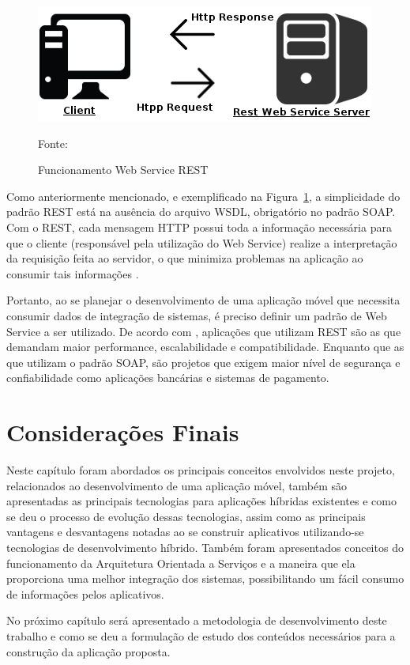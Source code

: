 \begin{figure}[H]
    \centering
    \includegraphics{imagens/rest.png}
    \caption{Funcionamento Web Service REST}
    Fonte: \cite{eulalio2016webservices}
    \label{fig: REST}
\end{figure}

Como anteriormente mencionado, e exemplificado na Figura~\ref{fig: REST}, a simplicidade do padrão REST está na ausência do arquivo WSDL, obrigatório no padrão SOAP. Com o REST, cada mensagem HTTP possui toda a informação necessária para que o cliente (responsável pela utilização do Web Service) realize a interpretação da requisição feita ao servidor, o que minimiza problemas na aplicação ao consumir tais informações \cite{eulalio2016webservices}.

Portanto, ao se planejar o desenvolvimento de uma aplicação móvel que necessita consumir dados de integração de sistemas, é preciso definir um padrão de Web Service a ser utilizado. De acordo com \cite{tihomirovs2016webservices}, aplicações que utilizam REST são as que demandam maior performance, escalabilidade e compatibilidade. Enquanto que as que utilizam o padrão SOAP, são projetos que exigem maior nível de segurança e confiabilidade como aplicações bancárias e sistemas de pagamento.




\section{Considerações Finais}

Neste capítulo foram abordados os principais conceitos envolvidos neste projeto, relacionados ao desenvolvimento de uma aplicação móvel, também são apresentadas as principais tecnologias para aplicações híbridas existentes e como se deu o processo de evolução dessas tecnologias, assim como as principais vantagens e desvantagens notadas ao se construir aplicativos utilizando-se tecnologias de desenvolvimento híbrido. Também foram apresentados conceitos do funcionamento da Arquitetura Orientada a Serviços e a maneira que ela proporciona uma melhor integração dos sistemas, possibilitando um fácil consumo de informações pelos aplicativos.

No próximo capítulo será apresentado a metodologia de desenvolvimento deste trabalho e como se deu a formulação de estudo dos conteúdos necessários para a construção da aplicação proposta.